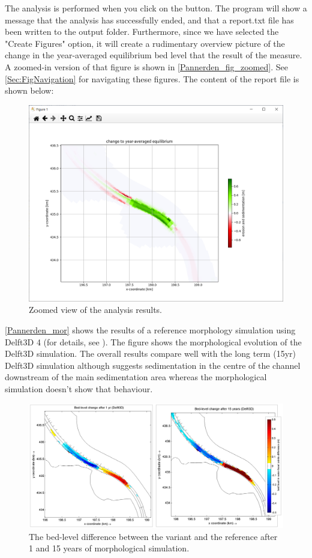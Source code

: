 
The \dfmi analysis is performed when you click on the  button.
The program will show a message that the analysis has successfully ended, and that a report.txt file has been written to the output folder.
Furthermore, since we have selected the "Create Figures" option, it will create a rudimentary overview picture of the change in the year-averaged equilibrium bed level that the result of the measure.
A zoomed-in version of that figure is shown in \autoref{Pannerden_fig_zoomed}.
See \autoref{Sec:FigNavigation} for navigating these figures.
The content of the report file is shown below:

\begin{figure}
\center
\includegraphics[width=\textwidth]{figures/Pannerden_fig_zoomed.png}
\caption{Zoomed view of the analysis results.}
\label{Pannerden_fig_zoomed}
\end{figure}


\autoref{Pannerden_mor} shows the results of a reference morphology simulation using Delft3D 4 (for details, see \citet{GiriJagers2022}).
The figure shows the morphological evolution of the Delft3D simulation.
The overall \dfastmi results compare well with the long term (15yr) Delft3D simulation although \dfmi suggests sedimentation in the centre of the channel downstream of the main sedimentation area whereas the morphological simulation doesn't show that behaviour.

\begin{figure}[H]
\center
\includegraphics[width=\textwidth]{figures/Pannerden_mor.png}
\caption{The bed-level difference between the variant and the reference after 1 and 15 years of morphological simulation.}
\label{Pannerden_mor}
\end{figure}